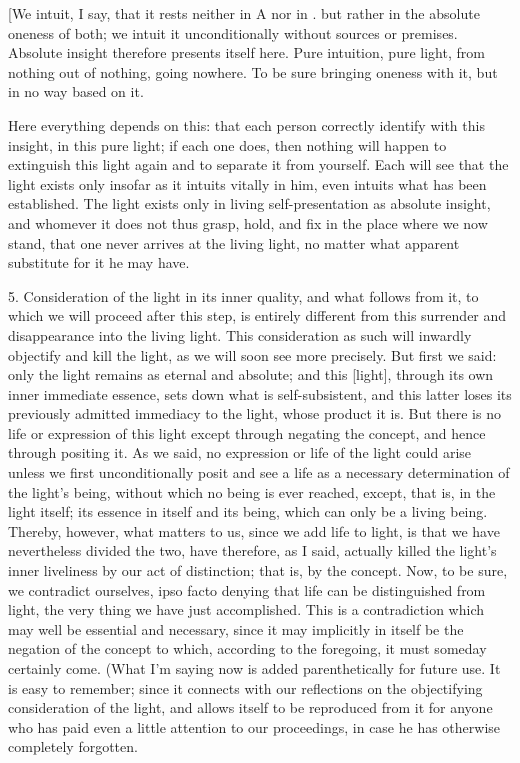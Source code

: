 [We intuit, I say, that it rests neither in A nor in .
but rather in the absolute oneness of both;
we intuit it unconditionally without sources or premises.
Absolute insight therefore presents itself here.
Pure intuition, pure light,
from nothing out of nothing, going nowhere.
To be sure bringing oneness with it,
but in no way based on it.

Here everything depends on this:
that each person correctly identify
with this insight, in this pure light;
if each one does, then nothing will happen
to extinguish this light again
and to separate it from yourself.
Each will see that the light exists only
insofar as it intuits vitally in him,
even intuits what has been established.
The light exists only in living
self-presentation as absolute insight,
and whomever it does not thus grasp,
hold, and fix in the place where we now stand,
that one never arrives at the living light,
no matter what apparent substitute for it he may have.

5. Consideration of the light in its inner quality,
and what follows from it,
to which we will proceed after this step,
is entirely different from this
surrender and disappearance into the living light.
This consideration as such will inwardly
objectify and kill the light,
as we will soon see more precisely.
But first we said:
only the light remains as eternal and absolute;
and this [light], through its own inner immediate essence,
sets down what is self-subsistent,
and this latter loses its previously admitted
immediacy to the light, whose product it is.
But there is no life or expression of this light
except through negating the concept, and hence through positing it.
As we said, no expression or life of the light could arise
unless we first unconditionally posit and see a life as
a necessary determination of the light's being,
without which no being is ever reached, except,
that is, in the light itself;
its essence in itself and its being,
which can only be a living being.
Thereby, however, what matters to us,
since we add life to light, is
that we have nevertheless divided the two,
have therefore, as I said, actually killed
the light's inner liveliness
by our act of distinction;
that is, by the concept.
Now, to be sure, we contradict ourselves,
ipso facto denying that life can be distinguished from light,
the very thing we have just accomplished.
This is a contradiction which may well be essential and necessary,
since it may implicitly in itself be the negation of
the concept to which, according to the foregoing,
it must someday certainly come.
(What I'm saying now is added parenthetically for future use.
It is easy to remember;
since it connects with our reflections on
the objectifying consideration of the light,
and allows itself to be reproduced from it
for anyone who has paid even a little attention
to our proceedings, in case he has otherwise completely forgotten.

